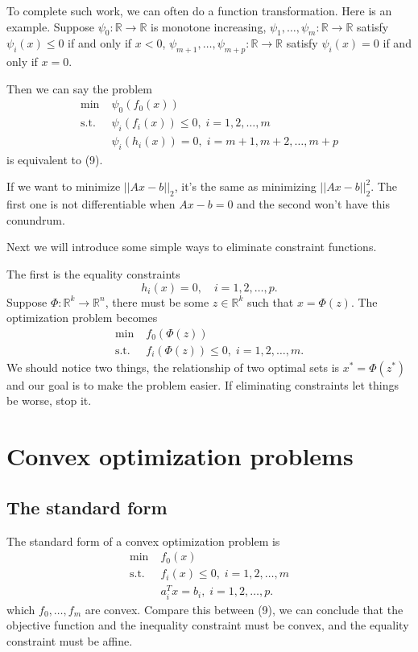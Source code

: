 \documentclass[lang=en,color=blue,mode=fancy,titlestyle=hang]{elegantbook}
\begin{document}
To complete such work, we can often do a function transformation. Here is an example.
Suppose $\psi_0: \mathbb{R} \rightarrow \mathbb{R}$ is monotone increasing,
$\psi_1, \ldots, \psi_m: \mathbb{R} \rightarrow \mathbb{R}$ satisfy $\psi_i(x) \leq 0$
if and only if $x < 0$, $\psi_{m+1}, \ldots, \psi_{m+p}: \mathbb{R} \rightarrow \mathbb{R}$
satisfy $\psi_i(x) = 0$ if and only if $x = 0$.

Then we can say the problem
\begin{align*}
  \min \; &\psi_0(f_0(x)) \\
  \text{s.t.} \; &\psi_i(f_i(x)) \leq 0, \; i = 1, 2, \ldots, m \\
  &\psi_i(h_i(x)) = 0, \; i = m + 1, m + 2, \ldots, m + p
\end{align*}
is equivalent to (9).

If we want to minimize $||A x - b||_2$, it's the same as minimizing $||A x - b||_2^2$.
The first one is not differentiable when $Ax - b = 0$ and the second won't have this
conundrum.

Next we will introduce some simple ways to eliminate constraint functions.

The first is the equality constraints
\[
h_i(x) = 0, \quad i = 1, 2, \ldots, p.
\]
Suppose $\Phi: \mathbb{R}^k \rightarrow \mathbb{R}^n$, there must be some $z \in \mathbb{R}^k$
such that $x = \Phi(z)$. The optimization problem becomes
\begin{align*}
  \min \; &f_0(\Phi(z)) \\
  \text{s.t.} \; &f_i(\Phi(z)) \leq 0, \; i = 1, 2, \ldots, m.
\end{align*}
We should notice two things, the relationship of two optimal sets is $x^* = \Phi(z^*)$ and
our goal is to make the problem easier. If eliminating constraints let things be worse,
stop it.

\section{Convex optimization problems}
\subsection{The standard form}
The standard form of a convex optimization problem is
\begin{align*}
  \min \; &f_0(x) \\
  \text{s.t.} \; &f_i(x) \leq 0, \; i = 1, 2, \ldots, m \\
  &a_i^T x = b_i, \; i = 1, 2, \ldots, p.
\end{align*}
which $f_0, \ldots, f_m$ are convex. Compare this between (9), we can conclude that
the objective function and the inequality constraint must be convex, and the equality
constraint must be affine.
\end{document}
